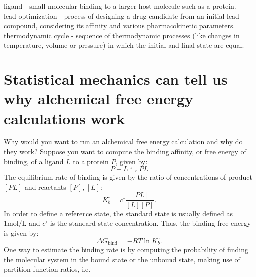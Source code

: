 \documentclass[9pt,bestpractices]{livecoms}
\begin{document}
\begin{tcolorbox}[title=Common terminology, colback=green!10!white]
    ligand - small molecular binding to a larger host molecule such as a protein.\\ 
    lead optimization - process of designing a drug candidate from an initial lead compound, considering its affinity and various pharmacokinetic parameters.\\
    thermodynamic cycle - sequence of thermodynamic processes (like changes in temperature, volume or pressure) in which the initial and final state are equal.
\end{tcolorbox}


\section{Statistical mechanics can tell us why alchemical free energy calculations work}
\label{sec:theory}
Why would you want to run an alchemical free energy calculation and why do they work? Suppose you want to compute the binding affinity, or free energy of binding, of a ligand $L$ to a protein $P$, given by:
\begin{equation}
P+L\leftrightharpoons PL
\end{equation}
The equilibrium rate of binding is given by the ratio of concentrations of product $[PL]$ and reactants $[P]$, $[L]$:
\begin{equation}
 K_b^{\circ} = c^{\circ}\frac{[PL]}{[L][P]}.
\end{equation}
In order to define a reference state, the standard state is usually defined as $1 \mathrm{mol}/\mathrm{L}$ and $c^\circ$ is the standard state concentration. Thus, the binding free energy is given by:
\begin{equation}
    \Delta G_{\mathrm{bind}} = -RT\ln K_b^{\circ}.
\end{equation}
One way to estimate the binding rate is by computing the probability of finding the molecular system in the bound state or the unbound state, making use of partition function ratios, i.e. 
\end{document}
